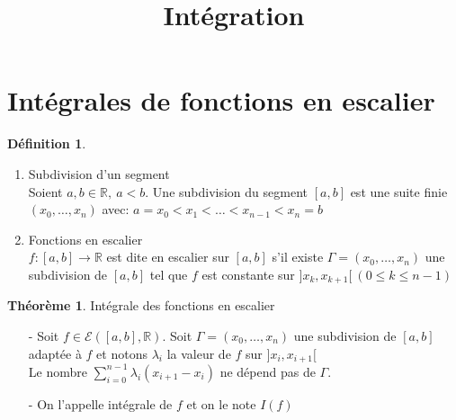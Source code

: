 \documentclass[fleqn]{article}
\title{Int\'egration}
\date{}
\theoremstyle{definition} \newtheorem*{defi}{D\'efinition}
\theoremstyle{definition} \newtheorem*{theo}{Th\'eor\`eme}
\theoremstyle{definition} \newtheorem*{coro}{Corollaire}
\theoremstyle{remark} \newtheorem*{rqs}{Remarques}
\theoremstyle{definition} \newtheorem*{prop}{Propri\'et\'e}
\begin{document}
\maketitle

\section{Int\'egrales de fonctions en escalier}
\begin{defi} $ $
\begin{enumerate}
	\item Subdivision d'un segment \\
		Soient $a, b\in \mathbb{R},\ a<b$. Une subdivision du segment $[a,b]$ est une suite finie $(x_0, \hdots, x_n)$ avec: $a=x_0 < x_1 < \hdots < x_{n-1} <  x_n = b$

	\item Fonctions en escalier\\
		$f: [a,b] \rightarrow \mathbb{R}$ est dite en escalier sur $[a,b]$ s'il existe $\Gamma = (x_0, \hdots, x_n)$ une subdivision de $[a,b]$
		tel que $f$ est constante sur $]x_k, x_{k+1}[\ (0 \leq k \leq n-1)$
\end{enumerate}
\end{defi}

\begin{theo} Int\'egrale des fonctions en escalier
	\begin{itemize}
	\item [-] Soit $f \in \mathcal{E}([a,b], \mathbb{R})$. Soit $\Gamma = (x_0, \hdots, x_n)$ une subdivision de $[a,b]$ adapt\'ee \`a $f$ et
		notons $\lambda_i$ la valeur de $f$ sur $]x_i, x_{i+1}[$ \\
		Le nombre $\sum_{i = 0}^{n-1} \lambda_i (x_{i+1} - x_i)$ ne d\'epend pas de $\Gamma$.
	\item [-] On l'appelle int\'egrale de $f$ et on le note $I(f)$
	\end{itemize}
\end{theo}
\end{document}
